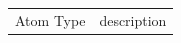 \begin{table}[!htbp]

\fontsize{7pt}{7pt}
\selectfont

\begin{tabular}{c|l}
Atom Type & description\\

\end{tabular}
\end{table}
